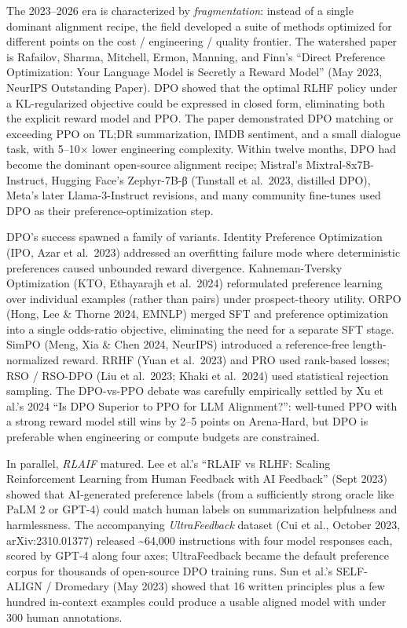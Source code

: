 \documentclass{article}
\begin{document}
The 2023--2026 era is characterized by \emph{fragmentation}: instead of a single dominant alignment recipe, the field developed a suite of methods optimized for different points on the cost / engineering / quality frontier. The watershed paper is Rafailov, Sharma, Mitchell, Ermon, Manning, and Finn's ``Direct Preference Optimization: Your Language Model is Secretly a Reward Model'' (May 2023, NeurIPS Outstanding Paper). DPO showed that the optimal RLHF policy under a KL-regularized objective could be expressed in closed form, eliminating both the explicit reward model and PPO. The paper demonstrated DPO matching or exceeding PPO on TL;DR summarization, IMDB sentiment, and a small dialogue task, with 5--10× lower engineering complexity. Within twelve months, DPO had become the dominant open-source alignment recipe; Mistral's Mixtral-8x7B-Instruct, Hugging Face's Zephyr-7B-β (Tunstall et al.~2023, distilled DPO), Meta's later Llama-3-Instruct revisions, and many community fine-tunes used DPO as their preference-optimization step.

DPO's success spawned a family of variants. Identity Preference Optimization (IPO, Azar et al.~2023) addressed an overfitting failure mode where deterministic preferences caused unbounded reward divergence. Kahneman-Tversky Optimization (KTO, Ethayarajh et al.~2024) reformulated preference learning over individual examples (rather than pairs) under prospect-theory utility. ORPO (Hong, Lee \& Thorne 2024, EMNLP) merged SFT and preference optimization into a single odds-ratio objective, eliminating the need for a separate SFT stage. SimPO (Meng, Xia \& Chen 2024, NeurIPS) introduced a reference-free length-normalized reward. RRHF (Yuan et al.~2023) and PRO used rank-based losses; RSO / RSO-DPO (Liu et al.~2023; Khaki et al.~2024) used statistical rejection sampling. The DPO-vs-PPO debate was carefully empirically settled by Xu et al.'s 2024 ``Is DPO Superior to PPO for LLM Alignment?'': well-tuned PPO with a strong reward model still wins by 2--5 points on Arena-Hard, but DPO is preferable when engineering or compute budgets are constrained.

In parallel, \emph{RLAIF} matured. Lee et al.'s ``RLAIF vs RLHF: Scaling Reinforcement Learning from Human Feedback with AI Feedback'' (Sept 2023) showed that AI-generated preference labels (from a sufficiently strong oracle like PaLM 2 or GPT-4) could match human labels on summarization helpfulness and harmlessness. The accompanying \emph{UltraFeedback} dataset (Cui et al., October 2023, arXiv:2310.01377) released \textasciitilde64,000 instructions with four model responses each, scored by GPT-4 along four axes; UltraFeedback became the default preference corpus for thousands of open-source DPO training runs. Sun et al.'s SELF-ALIGN / Dromedary (May 2023) showed that 16 written principles plus a few hundred in-context examples could produce a usable aligned model with under 300 human annotations.
\end{document}
